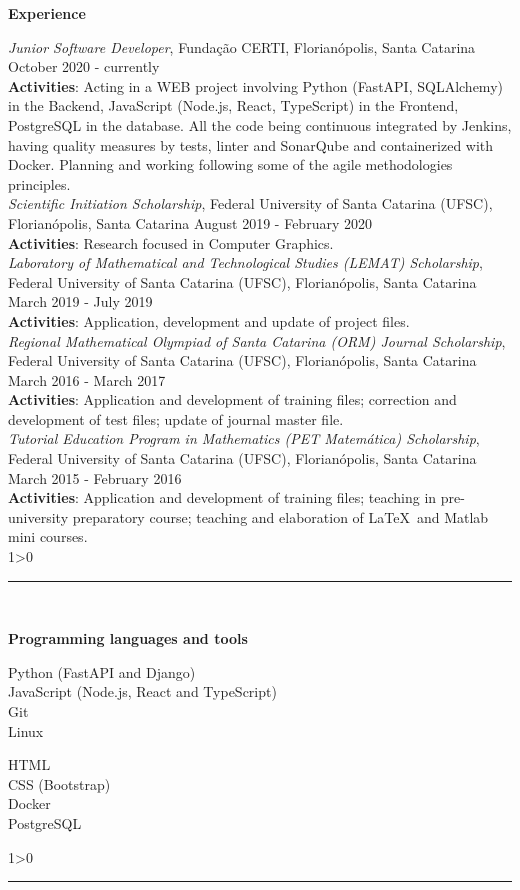\documentclass[a4paper,10pt]{article}
\newcommand{\createSection}[4][0]{
    \noindent
	\begin{minipage}{0.16\linewidth}
		\large{\textbf{#2}}
		\vspace{#3\baselineskip}
	\end{minipage}
	\hfill
	\begin{minipage}{0.79\linewidth}
		#4
		\ifnum0#1>0 { \hrule {\ } } \fi
	\end{minipage}
	\vspace{\baselineskip}
}
\begin{document}
	\createSection[1]{Experience}{21}{
	    \textit{Junior Software Developer}, Fundação CERTI, Florianópolis, Santa Catarina \hfill October 2020 - currently \\
	    \textbf{Activities}: Acting in a WEB project involving Python (FastAPI, SQLAlchemy) in the Backend, JavaScript (Node.js, React, TypeScript) in the Frontend, PostgreSQL in the database. All the code being continuous integrated by Jenkins, having quality measures by tests, linter and SonarQube and containerized with Docker. Planning and working following some of the agile methodologies principles. \\

	    \textit{Scientific Initiation Scholarship}, Federal University of Santa Catarina (UFSC), Florianópolis, Santa Catarina \hfill August 2019 - February 2020 \\
		\textbf{Activities}: Research focused in Computer Graphics.\\

		\textit{Laboratory of Mathematical and Technological Studies (LEMAT) Scholarship}, Federal University of Santa Catarina (UFSC), Florianópolis, Santa Catarina \hfill March 2019 - July 2019 \\
		\textbf{Activities}: Application, development and update of project files.\\

		\textit{Regional Mathematical Olympiad of Santa Catarina (ORM) Journal Scholarship}, Federal University of Santa Catarina (UFSC), Florianópolis, Santa Catarina \hfill March 2016 - March 2017 \\
		\textbf{Activities}: Application and development of training files; correction and development of test files; update of journal master file.\\

		\textit{Tutorial Education Program in Mathematics (PET Matemática) Scholarship}, Federal University of Santa Catarina (UFSC), Florianópolis, Santa Catarina \hfill March 2015 - February 2016 \\
		\textbf{Activities}: Application and development of training files; teaching in pre-university preparatory course; teaching and elaboration of \LaTeX\ and Matlab mini courses.\\
	}

    \createSection[1]{Programming languages and tools}{2}{
        \large{\bf
			\begin{minipage}{0.6\linewidth}
				Python (FastAPI and Django)\\
				JavaScript (Node.js, React and TypeScript)\\
				Git\\
				Linux\\
			\end{minipage}
			\begin{minipage}{0.4\linewidth}
				HTML\\
				CSS (Bootstrap)\\
				Docker\\
				PostgreSQL\\
			\end{minipage}
		}
    }
\end{document}
